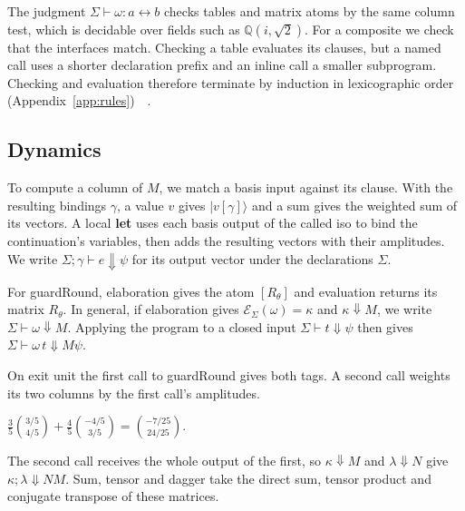 \documentclass[acmsmall,screen,review,anonymous,nonacm]{acmart}
\newcommand{\storyinlinekwface}{\storyinlineface\bfseries}}
\newcommand{\storyinlineface}{\small\ttfamily}
\newcommand{\storyinlinekwface}{\small\ttfamily\bfseries}
\newcommand{\kw}[1]{\textnormal{\storyinlinekwface #1}}
\newcommand{\code}[1]{\textnormal{\storyinlineface #1}}
\newcommand{\ket}[1]{\lvert #1\rangle}
\numberwithin{equation}{section}
\begin{document}
The judgment $\Sigma\vdash\omega:a\leftrightarrow b$ checks tables and matrix atoms by the
same column test, which is decidable over fields such as $\mathbb Q(i,\sqrt2)$. For a
composite we check that the interfaces match. Checking a table evaluates its clauses, but
a named call uses a shorter declaration prefix and an inline call a smaller subprogram.
Checking and evaluation therefore terminate by induction in lexicographic order (Appendix~\ref{app:rules})~\cite[\S\S~2,
5]{SabryValironVizzotto18}~\cite[Ch.~3]{Lemonnier24}.

\subsection{Dynamics}
To compute a column of $M$, we match a basis input
against its clause. With the resulting bindings $\gamma$, a value $v$
gives $\ket{v[\gamma]}$ and a sum gives the weighted sum of its vectors.
A local \kw{let} uses each basis output of the called iso to bind the continuation's
variables, then adds the resulting vectors with their amplitudes.
We write $\Sigma;\gamma\vdash e\Downarrow\psi$ for its output vector under the declarations $\Sigma$.

For \code{guardRound}, elaboration gives the atom $[R_\theta]$ and evaluation returns its
matrix $R_\theta$. In general, if elaboration gives
$\mathcal E_\Sigma(\omega)=\kappa$ and $\kappa\Downarrow M$, we write
$\Sigma\vdash\omega\Downarrow M$. Applying the program to a closed input
$\Sigma\vdash t\Downarrow\psi$ then gives $\Sigma\vdash\omega\,t\Downarrow M\psi$.

\par\smallskip\noindent\begin{minipage}[c]{0.49\linewidth}
On \code{exit unit} the first call to \code{guardRound} gives both tags. A second call
weights its two columns by the first call's amplitudes.
\end{minipage}\hfill\begin{minipage}[c]{0.49\linewidth}\centering
$\displaystyle \frac35\binom{3/5}{4/5}+\frac45\binom{-4/5}{3/5}
  =\binom{-7/25}{24/25}.$
\end{minipage}\par\smallskip
The second call receives the whole output of the first, so $\kappa\Downarrow M$ and $\lambda\Downarrow N$ give $\kappa;\lambda\Downarrow NM$. Sum, tensor and dagger take the direct sum, tensor product and conjugate transpose of these matrices.
\end{document}
